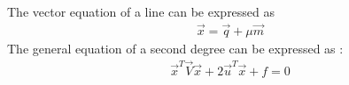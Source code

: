 

The vector equation of a line can be expressed as 
\begin{align}
    \vec{x} = \vec{q} +\mu\vec{m} \label{eq:solutions/4/2/3/vec_eqn_of_line}
\end{align}
The general equation of a second degree can be expressed as :
\begin{align}
\vec{x}^T\vec{V}\vec{x}+2\vec{u}^T\vec{x}+f=0\label{eq:solutions/4/2/3/gen__quad_eqn}
\end{align}



